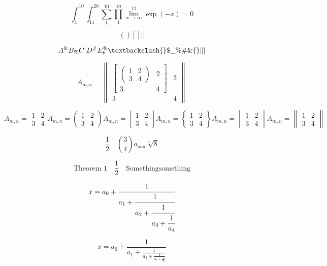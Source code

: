 \documentclass[a4paper,12pt]{article}
\begin{document}
$$ 
\int^{10}_1 \int_{11}^{20} \sum^{10}_{1} \prod_{1}^{10} \lim_{x \to \infty}^{12} \exp(-x) = 0
$$

$$
\left( \right) \left[ \right] \left| \right|
$$

$$
A^\& B_\% C^. D^\# E_\$^@ \textbackslash \lbrace \rbrace \$ \_ \% \# \& \{ \}  \| |
$$

$$
A_{m,n} = \begin{Vmatrix} \begin{bmatrix} \begin{pmatrix} 1 & 2 \\ 3 & 4 \end{pmatrix} & 2 \\ 3 & 4 \end{bmatrix} & 2 \\ 3 & 4 \end{Vmatrix}
$$

$$
A_{m,n} = \begin{matrix} 1 & 2 \\ 3 & 4 \end{matrix}
A_{m,n} = \begin{pmatrix} 1 & 2 \\ 3 & 4 \end{pmatrix}
A_{m,n} = \begin{bmatrix} 1 & 2 \\ 3 & 4 \end{bmatrix}
A_{m,n} = \begin{Bmatrix} 1 & 2 \\ 3 & 4 \end{Bmatrix}
A_{m,n} = \begin{vmatrix} 1 & 2 \\ 3 & 4 \end{vmatrix}
A_{m,n} = \begin{Vmatrix} 1 & 2 \\ 3 & 4 \end{Vmatrix}
$$

$$
\frac12 \quad \binom34 a_{aaa} \sqrt[3]{8}
$$

$$
\text{Theorem 1} \quad \frac12 \quad \mathrm{Something something}
$$

$$
  x = a_0 + \cfrac{1}{a_1
          + \cfrac{1}{a_2
          + \cfrac{1}{a_3 + \cfrac{1}{a_4} } } }
$$

$$
  x = a_0 + \frac{1}{a_1
          + \frac{1}{a_2
          + \frac{1}{a_3 + \frac{1}{a_4} } } }
$$
\end{document}
